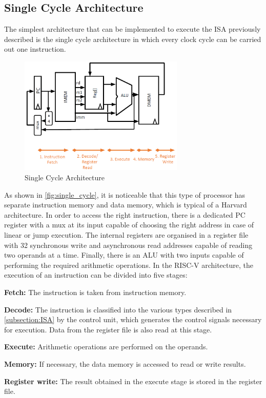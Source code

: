\subsection{Single Cycle Architecture}
The simplest architecture that can be implemented to execute the ISA previously described is the single cycle architecture in which every clock cycle can be carried out one instruction.
\begin{figure}[h]
  \center
  \includegraphics[width=0.7\textwidth]{sec1/images/single_cycle.png}
  \caption{Single Cycle Architecture}
  \label{fig:single_cycle}
\end{figure}
As shown in \autoref{fig:single_cycle}, it is noticeable that this type of processor has separate instruction memory and data memory, which is typical of a Harvard architecture. In order to access the right instruction, there is a dedicated PC register with a mux at its input capable of choosing the right address in case of linear or jump execution. The internal registers are organised in a register file with 32 synchronous write and asynchronous read addresses capable of reading two operands at a time. Finally, there is an ALU with two inputs capable of performing the required arithmetic operations.
In the RISC-V architecture, the execution of an instruction can be divided into five stages:

\begin{description}
    \item \textbf{Fetch:} The instruction is taken from instruction memory.
    \item \textbf{Decode:} The instruction is classified into the various types described in \autoref{subsection:ISA} by the control unit, which generates the control signals necessary for execution. Data from the register file is also read at this stage.
    \item \textbf{Execute:} Arithmetic operations are performed on the operands.
    \item \textbf{Memory:} If necessary, the data memory is accessed to read or write results.
    \item \textbf{Register write:} The result obtained in the execute stage is stored in the register file.
\end{description}
